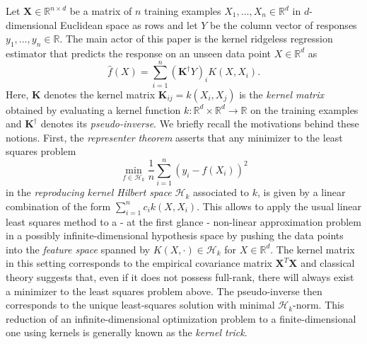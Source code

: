 \documentclass[12pt]{amsart}
\newcommand{\R}{\mathbb{R}}
\begin{document}
Let $\mathbf X \in \R^{n \times d}$ be a matrix of $n$ training examples
$X_1, \dots, X_n \in \R^d$ in $d$-dimensional Euclidean space as rows and 
let $Y$ be the column vector of responses $y_1, \dots, y_n \in \R$.
The main actor of this paper is the kernel ridgeless regression estimator
that predicts the response on an unseen data point $X \in \R^d$ as
\begin{equation} \label{eq:ridgeless}
    \hat f(X) = \sum_{i=1}^n (\mathbf K^\dagger Y)_i K(X, X_i).
\end{equation}
Here, $\mathbf K$ denotes the kernel matrix $\mathbf K_{ij} = k(X_i, X_j)$
is the \emph{kernel matrix} obtained by evaluating a kernel function 
$k \colon \R^d \times \R^d \to \R$ on the training examples and 
$\mathbf K^\dagger$ denotes its \emph{pseudo-inverse}.
We briefly recall the motivations behind these notions.
First, the \emph{representer theorem} asserts that any minimizer to the 
least squares problem
\[ \min_{f \in \mathcal H_k} \frac 1n \sum_{i=1}^n (y_i - f(X_i))^2 \]
in the \emph{reproducing kernel Hilbert space} $\mathcal H_k$ associated
to $k$, is given by a linear combination of the form
$\sum_{i=1}^n c_i k(X,X_i)$.
This allows to apply the usual linear least squares method to a - at the 
first glance - non-linear approximation problem in a possibly 
infinite-dimensional hypothesis space by pushing the data points into 
the \emph{feature space} spanned by $K(X, \cdot) \in \mathcal H_k$ 
for $X \in \R^d$.
The kernel matrix in this setting corresponds to the empirical covariance
matrix $\mathbf X^T \mathbf X$ and classical theory suggests that, even if 
it does not possess full-rank, there will always exist a minimizer to 
the least squares problem above.
The pseudo-inverse then corresponds to the unique least-squares solution
with minimal $\mathcal H_k$-norm.
This reduction of an infinite-dimensional optimization problem to a
finite-dimensional one using kernels is generally known as the 
\emph{kernel trick}.
\end{document}
